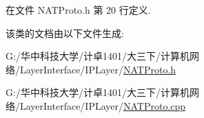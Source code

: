 在文件 N\+A\+T\+Proto.\+h 第 20 行定义.



该类的文档由以下文件生成\+:\begin{DoxyCompactItemize}
\item 
G\+:/华中科技大学/计卓1401/大三下/计算机网络/\+Layer\+Interface/\+I\+P\+Layer/\hyperlink{_n_a_t_proto_8h}{N\+A\+T\+Proto.\+h}\item 
G\+:/华中科技大学/计卓1401/大三下/计算机网络/\+Layer\+Interface/\+I\+P\+Layer/\hyperlink{_n_a_t_proto_8cpp}{N\+A\+T\+Proto.\+cpp}\end{DoxyCompactItemize}
